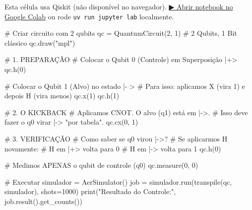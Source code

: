 \documentclass[
  brazilian,
]{report}
\newenvironment{Shaded}{\begin{snugshade}}{\end{snugshade}}
\newcommand{\BuiltInTok}[1]{\textcolor[rgb]{0.00,0.23,0.31}{#1}}
\newcommand{\CommentTok}[1]{\textcolor[rgb]{0.37,0.37,0.37}{#1}}
\newcommand{\DecValTok}[1]{\textcolor[rgb]{0.68,0.00,0.00}{#1}}
\newcommand{\NormalTok}[1]{\textcolor[rgb]{0.00,0.23,0.31}{#1}}
\newcommand{\OperatorTok}[1]{\textcolor[rgb]{0.37,0.37,0.37}{#1}}
\newcommand{\StringTok}[1]{\textcolor[rgb]{0.13,0.47,0.30}{#1}}
\begin{document}
\begin{tcolorbox}[enhanced jigsaw, arc=.35mm, bottomrule=.15mm, bottomtitle=1mm, breakable, colback=white, colbacktitle=quarto-callout-warning-color!10!white, colframe=quarto-callout-warning-color-frame, coltitle=black, left=2mm, leftrule=.75mm, opacityback=0, opacitybacktitle=0.6, rightrule=.15mm, title=\textcolor{quarto-callout-warning-color}{\faExclamationTriangle}\hspace{0.5em}{⚛️ Célula Qiskit --- execute no Colab ou localmente}, titlerule=0mm, toprule=.15mm, toptitle=1mm]

Esta célula usa Qiskit (não disponível no navegador).
\href{https://colab.research.google.com/github/maxwellamaral/aula-quantum/blob/main/notebooks/05-interference.ipynb}{▶
Abrir notebook no Google Colab} ou rode \texttt{uv\ run\ jupyter\ lab}
localmente.

\begin{Shaded}
\begin{Highlighting}[]

\CommentTok{\# Criar circuito com 2 qubits}
\NormalTok{qc }\OperatorTok{=}\NormalTok{ QuantumCircuit(}\DecValTok{2}\NormalTok{, }\DecValTok{1}\NormalTok{)  }\CommentTok{\# 2 Qubits, 1 Bit clássico}
\NormalTok{qc.draw(}\StringTok{"mpl"}\NormalTok{)}

\CommentTok{\# 1. PREPARAÇÃO}
\CommentTok{\# Colocar o Qubit 0 (Controle) em Superposição |+\textgreater{}}
\NormalTok{qc.h(}\DecValTok{0}\NormalTok{)}

\CommentTok{\# Colocar o Qubit 1 (Alvo) no estado |{-} \textgreater{}}
\CommentTok{\# Para isso: aplicamos X (vira 1) e depois H (vira menos)}
\NormalTok{qc.x(}\DecValTok{1}\NormalTok{)}
\NormalTok{qc.h(}\DecValTok{1}\NormalTok{)}

\CommentTok{\# 2. O KICKBACK}
\CommentTok{\# Aplicamos CNOT. O alvo (q1) está em |{-}\textgreater{}.}
\CommentTok{\# Isso deve fazer o q0 virar |{-}\textgreater{} "por tabela".}
\NormalTok{qc.cx(}\DecValTok{0}\NormalTok{, }\DecValTok{1}\NormalTok{)}

\CommentTok{\# 3. VERIFICAÇÃO}
\CommentTok{\# Como saber se q0 virou |{-}\textgreater{}?}
\CommentTok{\# Se aplicarmos H novamente:}
\CommentTok{\# H em |+\textgreater{} volta para 0}
\CommentTok{\# H em |{-}\textgreater{} volta para 1}
\NormalTok{qc.h(}\DecValTok{0}\NormalTok{)}

\CommentTok{\# Medimos APENAS o qubit de controle (q0)}
\NormalTok{qc.measure(}\DecValTok{0}\NormalTok{, }\DecValTok{0}\NormalTok{)}

\CommentTok{\# Executar}
\NormalTok{simulador }\OperatorTok{=}\NormalTok{ AerSimulator()}
\NormalTok{job }\OperatorTok{=}\NormalTok{ simulador.run(transpile(qc, simulador), shots}\OperatorTok{=}\DecValTok{1000}\NormalTok{)}
\BuiltInTok{print}\NormalTok{(}\StringTok{"Resultado do Controle:"}\NormalTok{, job.result().get\_counts())}
\end{Highlighting}
\end{Shaded}

\end{tcolorbox}
\end{document}
